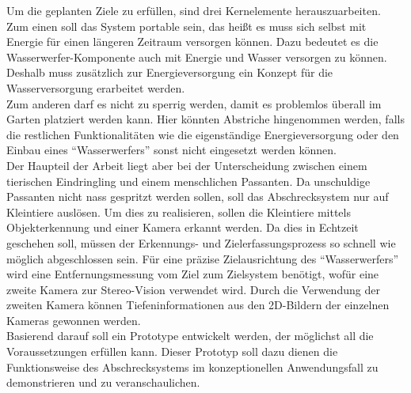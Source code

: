 Um die geplanten Ziele zu erfüllen, sind drei Kernelemente herauszuarbeiten. Zum einen soll das System portable sein, das heißt es muss sich selbst mit Energie für einen längeren Zeitraum versorgen können. Dazu bedeutet es die Wasserwerfer-Komponente auch mit Energie und Wasser versorgen zu können. Deshalb muss zusätzlich zur Energieversorgung ein Konzept für die Wasserversorgung erarbeitet werden.
\\
Zum anderen darf es nicht zu sperrig werden, damit es problemlos überall im Garten platziert werden kann. Hier könnten Abstriche hingenommen werden, falls die restlichen Funktionalitäten wie die eigenständige Energieversorgung oder den Einbau eines \enquote{Wasserwerfers} sonst nicht eingesetzt werden können.
\\
Der Haupteil der Arbeit liegt aber bei der Unterscheidung zwischen einem tierischen Eindringling und einem menschlichen Passanten. Da unschuldige Passanten nicht nass gespritzt werden sollen, soll das Abschrecksystem nur auf Kleintiere auslösen. Um dies zu realisieren, sollen die Kleintiere mittels Objekterkennung und einer Kamera erkannt werden. Da dies in Echtzeit geschehen soll, müssen der Erkennungs- und Zielerfassungsprozess so schnell wie möglich abgeschlossen sein. Für eine präzise Zielausrichtung des \enquote{Wasserwerfers} wird eine Entfernungsmessung vom Ziel zum Zielsystem benötigt, wofür eine zweite Kamera zur Stereo-Vision verwendet wird. Durch die Verwendung der zweiten Kamera können Tiefeninformationen aus den 2D-Bildern der einzelnen Kameras gewonnen werden.
\\
Basierend darauf soll ein Prototype entwickelt werden, der möglichst all die Voraussetzungen erfüllen kann. Dieser Prototyp soll dazu dienen die Funktionsweise des Abschrecksystems im konzeptionellen Anwendungsfall zu demonstrieren und zu veranschaulichen.

